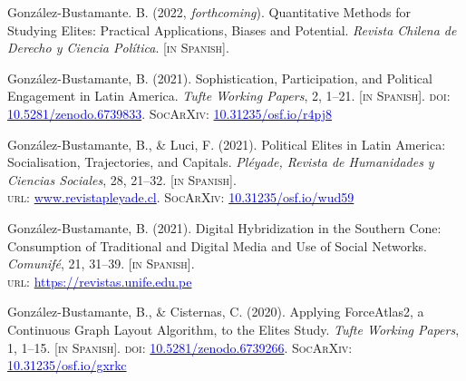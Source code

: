 
\begin{publications}

\begin{benumerate}{14}

\item{\small González-Bustamante. B. (2022, {\itshape forthcoming}). Quantitative Methods for Studying Elites: Practical Applications, Biases and Potential. {\itshape Revista Chilena de Derecho y Ciencia Política}. {\footnotesize \scshape [in Spanish]}.}\vspace{1mm}

\item{\small González-Bustamante, B. (2021). Sophistication, Participation, and Political Engagement in Latin America. {\itshape Tufte Working Papers}, 2, 1--21. {\footnotesize \scshape [in Spanish]}. {\scshape doi:} \href{https://doi.org/10.5281/zenodo.6739833}{\textcolor{blue}{10.5281/zenodo.6739833}}. {\scshape \footnotesize SocArXiv}: \href{https://doi.org/10.31235/osf.io/r4pj8}{\textcolor{blue}{10.31235/osf.io/r4pj8}}}\vspace{1mm}

\item{\small González-Bustamante, B., \& Luci, F. (2021). Political Elites in Latin America: Socialisation, Trajectories, and Capitals. {\itshape Pléyade, Revista de Humanidades y Ciencias Sociales}, 28, 21--32. {\footnotesize \scshape [in Spanish]}. \\ {\scshape url:} \href{http://www.revistapleyade.cl/index.php/OJS/article/view/359}{\textcolor{blue}{www.revistapleyade.cl}}. {\scshape \footnotesize SocArXiv}: \href{https://doi.org/10.31235/osf.io/wud59}{\textcolor{blue}{10.31235/osf.io/wud59}}}\vspace{1mm}

\item{\small González-Bustamante, B. (2021). Digital Hybridization in the Southern Cone: Consumption of Traditional and Digital Media and Use of Social Networks. {\itshape Comunifé}, 21, 31--39. {\footnotesize \scshape [in Spanish]}. \\ {\scshape url:} \href{https://revistas.unife.edu.pe/index.php/comunife/article/view/2580/}{\textcolor{blue}{https://revistas.unife.edu.pe}}}\vspace{1mm}

\item{\small González-Bustamante, B., \& Cisternas, C. (2020).  Applying ForceAtlas2, a Continuous Graph Layout Algorithm, to the Elites Study. {\itshape Tufte Working Papers}, 1, 1--15. {\footnotesize \scshape [in Spanish]}. {\scshape doi:} \href{https://doi.org/10.5281/zenodo.6739266}{\textcolor{blue}{10.5281/zenodo.6739266}}. {\scshape \footnotesize SocArXiv}: \href{https://doi.org/10.31235/osf.io/gxrkc}{\textcolor{blue}{10.31235/osf.io/gxrkc}}}\vspace{1mm}


\end{benumerate}
\end{publications}
